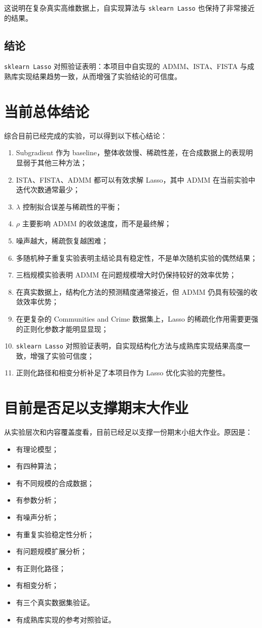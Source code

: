 \documentclass[12pt,a4paper]{ctexart}
\begin{document}
这说明在复杂真实高维数据上，自实现算法与 \texttt{sklearn Lasso} 也保持了非常接近的结果。

\subsection{结论}
\texttt{sklearn Lasso} 对照验证表明：本项目中自实现的 ADMM、ISTA、FISTA 与成熟库实现结果趋势一致，从而增强了实验结论的可信度。

\section{当前总体结论}
综合目前已经完成的实验，可以得到以下核心结论：
\begin{enumerate}[label=\arabic*.]
    \item Subgradient 作为 baseline，整体收敛慢、稀疏性差，在合成数据上的表现明显弱于其他三种方法；
    \item ISTA、FISTA、ADMM 都可以有效求解 Lasso，其中 ADMM 在当前实验中迭代次数通常最少；
    \item $\lambda$ 控制拟合误差与稀疏性的平衡；
    \item $\rho$ 主要影响 ADMM 的收敛速度，而不是最终解；
    \item 噪声越大，稀疏恢复越困难；
    \item 多随机种子重复实验表明主结论具有稳定性，不是单次随机实验的偶然结果；
    \item 三档规模实验表明 ADMM 在问题规模增大时仍保持较好的效率优势；
    \item 在真实数据上，结构化方法的预测精度通常接近，但 ADMM 仍具有较强的收敛效率优势；
    \item 在更复杂的 Communities and Crime 数据集上，Lasso 的稀疏化作用需要更强的正则化参数才能明显显现；
    \item \texttt{sklearn Lasso} 对照验证表明，自实现结构化方法与成熟库实现结果高度一致，增强了实验可信度；
    \item 正则化路径和相变分析补足了本项目作为 Lasso 优化实验的完整性。
\end{enumerate}

\section{目前是否足以支撑期末大作业}
从实验层次和内容覆盖度看，目前已经足以支撑一份期末小组大作业。原因是：
\begin{itemize}[leftmargin=2em]
    \item 有理论模型；
    \item 有四种算法；
    \item 有不同规模的合成数据；
    \item 有参数分析；
    \item 有噪声分析；
    \item 有重复实验稳定性分析；
    \item 有问题规模扩展分析；
    \item 有正则化路径；
    \item 有相变分析；
    \item 有三个真实数据集验证。
    \item 有成熟库实现的参考对照验证。
\end{itemize}
\end{document}

